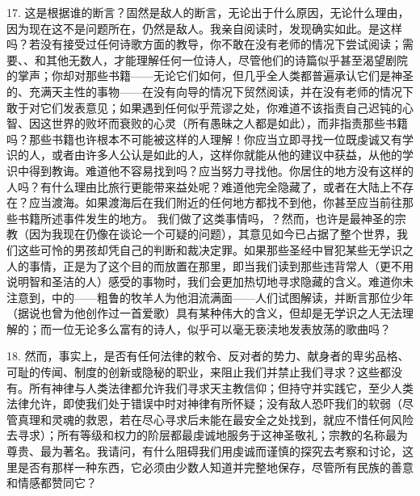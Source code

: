 17.  这是根据谁的断言？固然是敌人的断言，无论出于什么原因，无论什么理由，因为现在这不是问题所在，仍然是敌人。我亲自阅读时，发现确实如此。是这样吗？若没有接受过任何诗歌方面的教导，你不敢在没有老师的情况下尝试阅读；需要、、和其他无数人，才能理解任何一位诗人，尽管他们的诗篇似乎甚至渴望剧院的掌声；你却对那些书籍——无论它们如何，但几乎全人类都普遍承认它们是神圣的、充满天主性的事物——在没有向导的情况下贸然阅读，并在没有老师的情况下敢于对它们发表意见；如果遇到任何似乎荒谬之处，你难道不该指责自己迟钝的心智、因这世界的败坏而衰败的心灵（所有愚昧之人都是如此），而非指责那些书籍吗？那些书籍也许根本不可能被这样的人理解！你应当立即寻找一位既虔诚又有学识的人，或者由许多人公认是如此的人，这样你就能从他的建议中获益，从他的学识中得到教诲。难道他不容易找到吗？应当努力寻找他。你居住的地方没有这样的人吗？有什么理由比旅行更能带来益处呢？难道他完全隐藏了，或者在大陆上不存在？应当渡海。如果渡海后在我们附近的任何地方都找不到他，你甚至应当前往那些书籍所述事件发生的地方。\newline{} 我们做了这类事情吗，？然而，也许是最神圣的宗教（因为我现在仍像在谈论一个可疑的问题），其意见如今已占据了整个世界，我们这些可怜的男孩却凭自己的判断和裁决定罪。如果那些圣经中冒犯某些无学识之人的事情，正是为了这个目的而放置在那里，即当我们读到那些违背常人（更不用说明智和圣洁的人）感受的事物时，我们会更加热切地寻求隐藏的含义。难道你未注意到，中的——粗鲁的牧羊人为他泪流满面——人们试图解读，并断言那位少年（据说也曾为他创作过一首爱歌）具有某种伟大的含义，但却是无学识之人无法理解的；而一位无论多么富有的诗人，似乎可以毫无亵渎地发表放荡的歌曲吗？\par

18. 然而，事实上，是否有任何法律的敕令、反对者的势力、献身者的卑劣品格、可耻的传闻、制度的创新或隐秘的职业，来阻止我们并禁止我们寻求？这些都没有。所有神律与人类法律都允许我们寻求天主教信仰；但持守并实践它，至少人类法律允许，即使我们处于错误中时对神律有所怀疑；没有敌人恐吓我们的软弱（尽管真理和灵魂的救恩，若在尽心寻求后未能在最安全之处找到，就应不惜任何风险去寻求）；所有等级和权力的阶层都最虔诚地服务于这神圣敬礼；宗教的名称最为尊贵、最为著名。我请问，有什么阻碍我们用虔诚而谨慎的探究去考察和讨论，这里是否有那样一种东西，它必须由少数人知道并完整地保存，尽管所有民族的善意和情感都赞同它？\par


